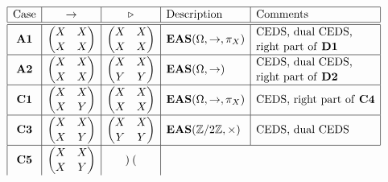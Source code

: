 \documentclass[pdftex]{sigma}
\numberwithin{equation}{section}
\newcommand{\eas}{\mathbf{EAS}}
\begin{document}
$$\renewcommand{\arraystretch}{1.1}
\begin{array}{|c|c|c|l|l|}
\hline \text{Case}&\rightarrow&\triangleright&\text{Description}&\text{Comments}\\
\hline \hline \mathbf{A1}&\begin{pmatrix}
X&X\\X&X
\end{pmatrix}&
\begin{pmatrix}
X&X\\X&X
\end{pmatrix}&\eas(\Omega,\rightarrow,\pi_X)&\begin{array}{@{}l@{}}\text{CEDS, dual CEDS,}\\
 \text{right part of \textbf{D1}}\end{array}\\
\hline \mathbf{A2}&\begin{pmatrix}
X&X\\X&X
\end{pmatrix}&
\begin{pmatrix}
X&X\\Y&Y
\end{pmatrix}&\eas(\Omega,\rightarrow)&\begin{array}{@{}l@{}}\text{CEDS, dual CEDS,}\\
\text{right part of \textbf{D2}}\end{array}\\
\hline \mathbf{C1} &\begin{pmatrix}
X&X\\X&Y
\end{pmatrix}&
\begin{pmatrix}
X&X\\X&X
\end{pmatrix}&\eas(\Omega,\rightarrow,\pi_X)&\text{CEDS, right part of \textbf{C4}}\\
\hline \mathbf{C3}&\begin{pmatrix}
X&X\\X&Y
\end{pmatrix}&
\begin{pmatrix}
X&X\\Y&Y
\end{pmatrix}&\eas(\mathbb{Z}/2\mathbb{Z},\times)&\text{CEDS, dual CEDS}\\
\hline \mathbf{C5} &\begin{pmatrix}
X&X\\X&Y
\end{pmatrix}&
\begin{pmatrix}

\end{pmatrix}
\end{array}$$
\end{document}
